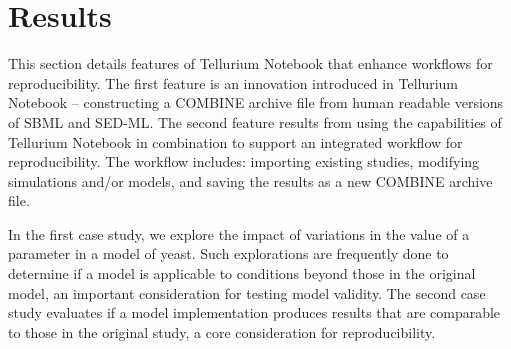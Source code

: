 \documentclass[10pt,letterpaper]{article}
\begin{document}


\section*{Results}

This section details features of Tellurium Notebook that enhance workflows for reproducibility. The first feature is an innovation introduced in Tellurium Notebook -- constructing a COMBINE archive file from human readable versions of SBML and SED-ML. The second feature results from using the capabilities of Tellurium Notebook in combination to support an integrated workflow for reproducibility. The workflow includes: importing existing studies, modifying simulations and/or models, and saving the results as a new COMBINE archive file.

In the first case study, we explore the impact of variations in the value of a parameter in a model of yeast. Such explorations are frequently done to determine if a model is applicable to conditions beyond those in the original model, an important consideration for testing model validity. The second case study evaluates if a model implementation produces results that are comparable to those in the original study, a core consideration for reproducibility.
\end{document}
